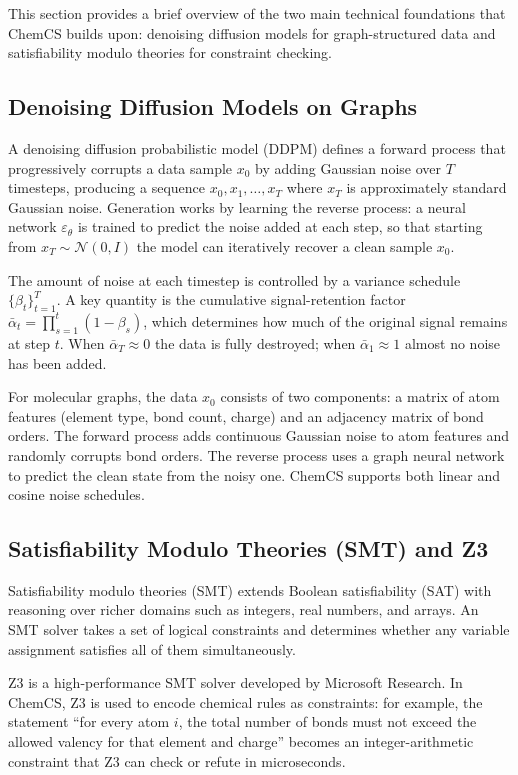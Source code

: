 \documentclass[11pt]{article}
\begin{document}
This section provides a brief overview of the two main technical
foundations that ChemCS builds upon: denoising diffusion models for
graph-structured data and satisfiability modulo theories for constraint
checking.

\subsection{Denoising Diffusion Models on Graphs}

A denoising diffusion probabilistic model (DDPM) defines a forward
process that progressively corrupts a data sample $x_0$ by adding
Gaussian noise over $T$ timesteps, producing a sequence
$x_0, x_1, \ldots, x_T$ where $x_T$ is approximately standard Gaussian
noise. Generation works by learning the reverse process: a neural
network $\varepsilon_\theta$ is trained to predict the noise added at
each step, so that starting from $x_T \sim \mathcal{N}(0, I)$ the model
can iteratively recover a clean sample $x_0$.

The amount of noise at each timestep is controlled by a variance
schedule $\{\beta_t\}_{t=1}^T$. A key quantity is the cumulative
signal-retention factor
$\bar\alpha_t = \prod_{s=1}^t (1 - \beta_s)$, which determines how much
of the original signal remains at step $t$. When $\bar\alpha_T \approx 0$
the data is fully destroyed; when $\bar\alpha_1 \approx 1$ almost no
noise has been added.

For molecular graphs, the data $x_0$ consists of two components: a
matrix of atom features (element type, bond count, charge) and an
adjacency matrix of bond orders. The forward process adds continuous
Gaussian noise to atom features and randomly corrupts bond orders. The
reverse process uses a graph neural network to predict the clean state
from the noisy one. ChemCS supports both linear and
cosine noise schedules.

\subsection{Satisfiability Modulo Theories (SMT) and Z3}

Satisfiability modulo theories (SMT) extends Boolean satisfiability
(SAT) with reasoning over richer domains such as integers, real
numbers, and arrays. An SMT solver takes a set of logical constraints
and determines whether any variable assignment satisfies all of them
simultaneously.

Z3 is a high-performance SMT solver developed by
Microsoft Research. In ChemCS, Z3 is used to encode chemical rules as
constraints: for example, the statement ``for every atom $i$, the total
number of bonds must not exceed the allowed valency for that element and
charge'' becomes an integer-arithmetic constraint that Z3 can check or
refute in microseconds.
\end{document}
